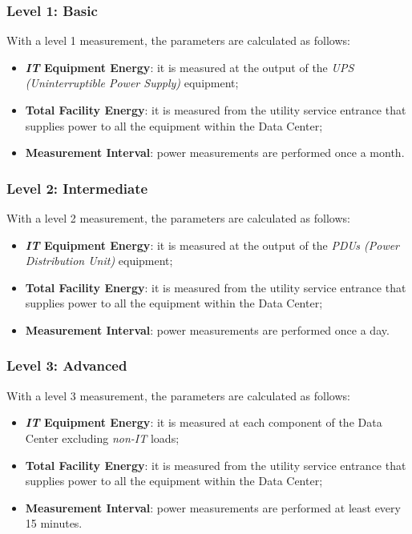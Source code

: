\subsubsection{Level 1: Basic}
With a level 1 measurement, the parameters are calculated as follows:
\begin{itemize}
    \item \textbf{\emph{IT} Equipment Energy}: it is measured at the output of the \emph{UPS (Uninterruptible Power Supply)} equipment;
    \item \textbf{Total Facility Energy}: it is measured from the utility service entrance that supplies power to all the equipment within the Data Center;
    \item \textbf{Measurement Interval}: power measurements are performed once a month.
\end{itemize}

\subsubsection{Level 2: Intermediate}
With a level 2 measurement, the parameters are calculated as follows:
\begin{itemize}
    \item \textbf{\emph{IT} Equipment Energy}: it is measured at the output of the \emph{PDUs (Power Distribution Unit)} equipment;
    \item \textbf{Total Facility Energy}: it is measured from the utility service entrance that supplies power to all the equipment within the Data Center;    
    \item \textbf{Measurement Interval}: power measurements are performed once a day.
\end{itemize}

\subsubsection{Level 3: Advanced}
With a level 3 measurement, the parameters are calculated as follows:
\begin{itemize}
    \item \textbf{\emph{IT} Equipment Energy}: it is measured at each component of the Data Center excluding \emph{non-IT} loads;
    \item \textbf{Total Facility Energy}: it is measured from the utility service entrance that supplies power to all the equipment within the Data Center;    
    \item \textbf{Measurement Interval}: power measurements are performed at least every 15 minutes.
\end{itemize}

